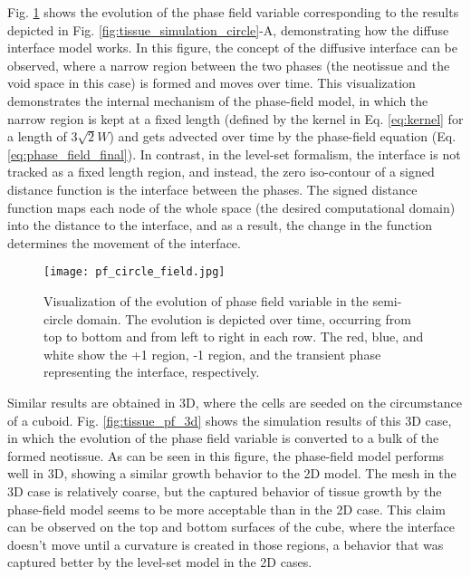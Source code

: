 Fig. \ref{fig:tissue_pf_circle_field} shows the evolution of the phase field variable corresponding to the results depicted in Fig. \ref{fig:tissue_simulation_circle}-A, demonstrating how the diffuse interface model works. In this figure, the concept of the diffusive interface can be observed, where a narrow region between the two phases (the neotissue and the void space in this case) is formed and moves over time. This visualization demonstrates the internal mechanism of the phase-field model, in which the narrow region is kept at a fixed length (defined by the kernel in Eq. \ref{eq:kernel} for a length of $3 \sqrt{2} W$) and gets advected over time by the phase-field equation (Eq. \ref{eq:phase_field_final}). In contrast, in the level-set formalism, the interface is not tracked as a fixed length region, and instead, the zero iso-contour of a signed distance function is the interface between the phases. The signed distance function maps each node of the whole space (the desired computational domain) into the distance to the interface, and as a result, the change in the function determines the movement of the interface.


\begin{figure}
\medskip
\centering
\texttt{[image: pf\_circle\_field.jpg]}
\caption[Visualization of the evolution of phase field variable in the semi-circle domain]{Visualization of the evolution of phase field variable in the semi-circle domain. The evolution is depicted over time, occurring from top to bottom and from left to right in each row. The red, blue, and white show the +1 region, -1 region, and the transient phase representing the interface, respectively.}
\label{fig:tissue_pf_circle_field}
\end{figure}

Similar results are obtained in 3D, where the cells are seeded on the circumstance of a cuboid. Fig. \ref{fig:tissue_pf_3d} shows the simulation results of this 3D case, in which the evolution of the phase field variable is converted to a bulk of the formed neotissue. As can be seen in this figure, the phase-field model performs well in 3D, showing a similar growth behavior to the 2D model. The mesh in the 3D case is relatively coarse, but the captured behavior of tissue growth by the phase-field model seems to be more acceptable than in the 2D case. This claim can be observed on the top and bottom surfaces of the cube, where the interface doesn't move until a curvature is created in those regions, a behavior that was captured better by the level-set model in the 2D cases. 

